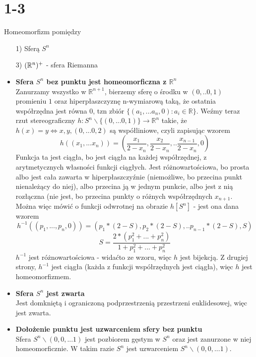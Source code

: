 \newpage
\section*{1-3}
Homeomorfizm pomiędzy
\begin{itemize}
  \item[1)] Sferą $S^n$
  \item[3)] $({\mathbb{R}}^n)^+$ - sfera Riemanna
\end{itemize}
\begin{itemize}
\item \textbf{Sfera $S^n$ bez punktu jest homeomorficzna z $\mathbb{R}^n$}\\
Zanurzamy wszystko w $\mathbb{R}^{n+1}$, bierzemy sferę o środku w $(0, .. 0, 1)$ promieniu $1$ oraz hiperpłaszczyznę n-wymiarową taką, że ostatnia współrzędna jest równa $0$, tzn zbiór $\{(a_1, ... a_n, 0): a_i \in \mathbb{R}\}$.
Weźmy teraz rzut stereograficzny $h: S^n \backslash \{(0, ... 0, 1)\} \rightarrow \mathbb{R}^n$ takie, że $h(x) = y \iff x, y, (0, ... 0, 2)$ są współliniowe, czyli zapisując wzorem
$$
h((x_1, ... x_n)) = (\frac{x_1}{2-x_n}, \frac{x_2}{2-x_n}, .. \frac{x_{n-1}}{2-x_n}, 0)
$$
Funkcja ta jest ciągła, bo jest ciągła na każdej współrzędnej, z arytmetycznych własności funkcji ciągłych.
Jest różnowartościowa, bo prosta albo jest cała zawarta w hiperpłaszczyźnie (niemożliwe, bo przecina punkt nienależący do niej), albo przecina ją w jednym punkcie, albo jest z nią rozłączna (nie jest, bo przecina punkty o różnych współrzędnych $x_{n+1}$.
Można więc mówić o funkcji odwrotnej na obrazie $h[S^n]$ - jest ona dana wzorem
$$
h^{-1}((p_1, ... , p_n, 0)) = (p_1 * (2-S), p_2*(2-S), .. p_{n-1} * (2-S), S)
$$
$$
S = \frac{2*(p_1^2 + ... + p_n^2)}{1 + p_1^2 + ... + p_n^2}
$$
$h^{-1}$ jest różnowartościowa - widaćto ze wzoru, więc $h$ jest bijekcją.
Z drugiej strony, $h^{-1}$ jest ciągła (każda z funkcji współrzędnych jest ciągła), więc $h$ jest homeomorfizmem.

\item \textbf{Sfera $S^n$ jest zwarta}\\
Jest domkniętą i ograniczoną podprzestrzenią przestrzeni euklidesowej, więc jest zwarta.

\item \textbf{Dołożenie punktu jest uzwarceniem sfery bez punktu}\\
Sfera $S^n \backslash (0, 0, ... 1)$ jest pozbiorem gęstym w $S^n$ oraz jest zanurzone w niej homeomorficznie. W takim razie $S^n$ jest uzwarceniem $S^n \backslash (0, 0, ... 1)$.


\end{itemize}
